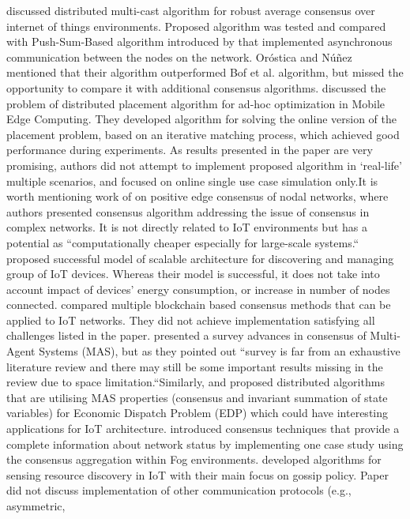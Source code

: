 \documentclass[	DIV=calc,%
							paper=a4,%
							fontsize=11pt,%
							twocolumn]{scrartcl}	 				%
\begin{document}
 discussed distributed multi-cast algorithm for robust average consensus over internet of things environments. Proposed algorithm was tested and compared with  Push-Sum-Based algorithm introduced by  that implemented asynchronous communication between the nodes on the network. Oróstica and Núñez mentioned that their algorithm outperformed Bof et al. algorithm, but missed the opportunity to compare it with additional consensus algorithms.\smallskip \newline {} discussed the problem of distributed placement algorithm for  ad-hoc optimization in Mobile Edge Computing. They developed algorithm for solving the online version of the placement problem, based on an iterative matching process, which achieved good performance during experiments. As results presented in the paper are very promising, authors did not attempt to implement proposed algorithm in ‘real-life’ multiple scenarios, and focused on online single use case simulation only.\smallskip \newline It is worth mentioning work of  on positive edge consensus of nodal networks, where authors presented consensus algorithm addressing the issue of consensus in complex networks. It is not directly related to IoT environments but has a potential as ``computationally cheaper especially for large-scale systems.``\smallskip \newline {} proposed successful model of scalable architecture for discovering and managing group of IoT devices. Whereas their model is successful, it does not take into account impact of devices’ energy consumption, or increase in number of nodes connected. \smallskip \newline {} compared multiple blockchain based consensus methods that can be applied to IoT networks. They did not achieve implementation satisfying all challenges listed in the paper. \smallskip \newline {} presented a survey advances in consensus of Multi-Agent Systems (MAS), but as they pointed out ``survey is far from an exhaustive literature review and there may still be some important results missing in the review due to space limitation.``\smallskip \newline Similarly,  and  proposed distributed algorithms that are utilising MAS properties (consensus and invariant summation of state variables) for Economic Dispatch Problem (EDP) which could have interesting applications for IoT architecture.\smallskip \newline {} introduced consensus techniques that provide a complete information about network status by implementing one case study using the consensus aggregation within Fog environments.\smallskip \newline {} developed algorithms for sensing resource discovery in IoT with their main focus on gossip policy. Paper did not discuss implementation of other communication protocols (e.g., asymmetric, 
\end{document}
